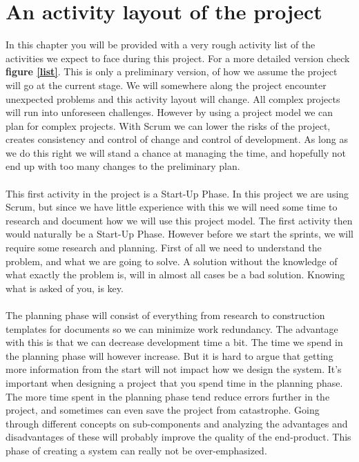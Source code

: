 \section{An activity layout of the project}

In this chapter you will be provided with a very rough activity list of the activities we expect to face during this project. For a more detailed version check \textbf{figure \ref{list}}. This is only a preliminary version, of how we assume the project will go at the current stage. We will somewhere along the project encounter unexpected problems and this activity layout will change. All complex projects will run into unforeseen challenges. However by using a project model we can plan for complex projects. With Scrum we can lower the risks of the project, creates consistency and control of change and control of development. As long as we do this right we will stand a chance at managing the time, and hopefully not end up with too many changes to the preliminary plan.\\
\\
This first activity in the project is a Start-Up Phase. In this project we are using Scrum, but since we have little experience with this we will need some time to research and document how we will use this project model. The first activity then would naturally be a Start-Up Phase. However before we start the sprints, we will require some research and planning. First of all we need to understand the problem, and what we are going to solve. A solution without the knowledge of what exactly the problem is, will in almost all cases be a bad solution. Knowing what is asked of you, is key. \\ 
\\
The planning phase will consist of everything from research to construction templates for documents so we can minimize work redundancy. The advantage with this is that we can decrease development time a bit. The time we spend in the planning phase will however increase. But it is hard to argue that getting more information from the start will not impact how we design the system. It's important when designing a project that you spend time in the planning phase. The more time spent in the planning phase tend reduce errors further in the project, and sometimes can even save the project from catastrophe. Going through different concepts on sub-components and analyzing the advantages and disadvantages of these will probably improve the quality of the end-product. This phase of creating a system can really not be over-emphasized. \\
